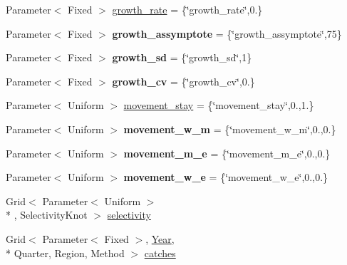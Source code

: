 \begin{DoxyCompactItemize}
\item 
Parameter$<$ Fixed $>$ \hyperlink{classIOSKJ_1_1Parameters_a21e9e39539dc623a6d4a179f52c243d6}{growth\-\_\-rate} = \{\char`\"{}growth\-\_\-rate\char`\"{},0.\}
\item 
\hypertarget{classIOSKJ_1_1Parameters_a8bd1dc029fb4e47b43bf2608e2879a00}{Parameter$<$ Fixed $>$ {\bfseries growth\-\_\-assymptote} = \{\char`\"{}growth\-\_\-assymptote\char`\"{},75\}}\label{classIOSKJ_1_1Parameters_a8bd1dc029fb4e47b43bf2608e2879a00}

\item 
\hypertarget{classIOSKJ_1_1Parameters_a43d6ae91f8b5c649e81983689e007ab7}{Parameter$<$ Fixed $>$ {\bfseries growth\-\_\-sd} = \{\char`\"{}growth\-\_\-sd\char`\"{},1\}}\label{classIOSKJ_1_1Parameters_a43d6ae91f8b5c649e81983689e007ab7}

\item 
\hypertarget{classIOSKJ_1_1Parameters_abec19913eca67fc0d0ad6fe164ef2043}{Parameter$<$ Fixed $>$ {\bfseries growth\-\_\-cv} = \{\char`\"{}growth\-\_\-cv\char`\"{},0.\}}\label{classIOSKJ_1_1Parameters_abec19913eca67fc0d0ad6fe164ef2043}

\item 
Parameter$<$ Uniform $>$ \hyperlink{classIOSKJ_1_1Parameters_ab82e4c48509a372fde55b33e0a5823e6}{movement\-\_\-stay} = \{\char`\"{}movement\-\_\-stay\char`\"{},0.,1.\}
\item 
\hypertarget{classIOSKJ_1_1Parameters_a8eafe79341f14e09581c46cd58e527c2}{Parameter$<$ Uniform $>$ {\bfseries movement\-\_\-w\-\_\-m} = \{\char`\"{}movement\-\_\-w\-\_\-m\char`\"{},0.,0.\}}\label{classIOSKJ_1_1Parameters_a8eafe79341f14e09581c46cd58e527c2}

\item 
\hypertarget{classIOSKJ_1_1Parameters_a411d4a6310c09e9d07c6d02066c0f1ee}{Parameter$<$ Uniform $>$ {\bfseries movement\-\_\-m\-\_\-e} = \{\char`\"{}movement\-\_\-m\-\_\-e\char`\"{},0.,0.\}}\label{classIOSKJ_1_1Parameters_a411d4a6310c09e9d07c6d02066c0f1ee}

\item 
\hypertarget{classIOSKJ_1_1Parameters_abc04596c2285f5cdbac3dd1a7be55dcd}{Parameter$<$ Uniform $>$ {\bfseries movement\-\_\-w\-\_\-e} = \{\char`\"{}movement\-\_\-w\-\_\-e\char`\"{},0.,0.\}}\label{classIOSKJ_1_1Parameters_abc04596c2285f5cdbac3dd1a7be55dcd}

\item 
Grid$<$ Parameter$<$ Uniform $>$\\*
, Selectivity\-Knot $>$ \hyperlink{classIOSKJ_1_1Parameters_a5a522175284238012b5c49d7bd33a85a}{selectivity}
\item 
Grid$<$ Parameter$<$ Fixed $>$, \hyperlink{classIOSKJ_1_1Year}{Year}, \\*
Quarter, Region, Method $>$ \hyperlink{classIOSKJ_1_1Parameters_abc031aa9ac8ebeb935c3215d9bae0b55}{catches}
\end{DoxyCompactItemize}



